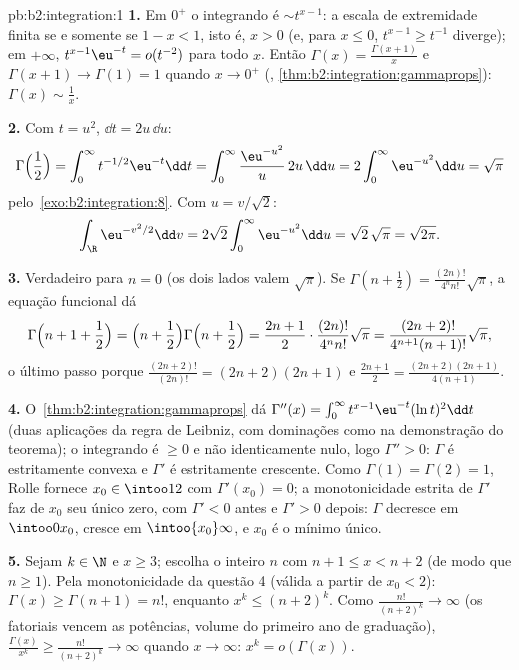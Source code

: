 \begin{solution}{pb:b2:integration:1}
\textbf{1.} Em $0^+$ o integrando é $\sim t^{x-1}$: a
escala de extremidade finita  se e somente se $1 - x < 1$, isto é, $x > 0$
(e, para $x \leq 0$, $t^{x-1} \geq t^{-1}$ diverge); em
$+\infty$, $t^{x-1}\eu^{-t} = o(t^{-2})$  para todo
$x$. Então $\Gamma(x) = \frac{\Gamma(x+1)}{x}$ e $\Gamma(x+1)
\to \Gamma(1) = 1$ quando $x \to 0^+$ (,
\cref{thm:b2:integration:gammaprops}): $\Gamma(x) \sim
\frac1x$.

\textbf{2.} Com $t = u^2$, $\dd t = 2u\,\dd u$:
\[
\Gamma\Bigl(\frac12\Bigr) = \int_0^\infty
t^{-1/2}\eu^{-t}\dd t
= \int_0^\infty \frac{\eu^{-u^2}}{u}\,2u\,\dd u
= 2\int_0^\infty \eu^{-u^2}\dd u = \sqrt\pi
\]
pelo~\cref{exo:b2:integration:8}. Com $u = v/\sqrt2$:
\[
\int_\R \eu^{-v^2/2}\dd v
= 2\sqrt2\int_0^\infty \eu^{-u^2}\dd u
= \sqrt2\,\sqrt\pi = \sqrt{2\pi} .
\]

\textbf{3.} Verdadeiro para $n = 0$ (os dois lados valem $\sqrt\pi$). Se
$\Gamma(n + \frac12) = \frac{(2n)!}{4^n n!}\sqrt\pi$, a
equação funcional dá
\[
\Gamma\Bigl(n + 1 + \frac12\Bigr)
= \Bigl(n + \frac12\Bigr)\Gamma\Bigl(n + \frac12\Bigr)
= \frac{2n+1}{2}\cdot\frac{(2n)!}{4^n n!}\sqrt\pi
= \frac{(2n+2)!}{4^{n+1}(n+1)!}\sqrt\pi ,
\]
o último passo porque $\frac{(2n+2)!}{(2n)!} = (2n+2)(2n+1)$
e $\frac{2n+1}{2} = \frac{(2n+2)(2n+1)}{4(n+1)}$.

\textbf{4.} O~\cref{thm:b2:integration:gammaprops} dá
$\Gamma''(x) = \int_0^\infty t^{x-1}\eu^{-t}(\ln t)^2\dd t$
(duas aplicações da regra de Leibniz, com dominações como na
demonstração do teorema); o integrando é $\geq 0$ e não identicamente
nulo, logo $\Gamma'' > 0$: $\Gamma$ é estritamente convexa e
$\Gamma'$ é estritamente crescente. Como $\Gamma(1) = \Gamma(2)
= 1$, Rolle fornece $x_0 \in \intoo12$ com $\Gamma'(x_0) =
0$; a monotonicidade estrita de $\Gamma'$ faz de $x_0$ seu único
zero, com $\Gamma' < 0$ antes e $\Gamma' > 0$ depois:
$\Gamma$ decresce em $\intoo0{x_0}$, cresce em
$\intoo{x_0}\infty$, e $x_0$ é o mínimo único.

\textbf{5.} Sejam $k \in \N$ e $x \geq 3$; escolha o inteiro
$n$ com $n + 1 \leq x < n + 2$ (de modo que $n \geq 1$). Pela
monotonicidade da questão 4 (válida a partir de $x_0 < 2$): $\Gamma(x)
\geq \Gamma(n + 1) = n!$, enquanto $x^k \leq (n+2)^k$. Como
$\frac{n!}{(n+2)^k} \to \infty$ (os fatoriais vencem as potências, volume do primeiro ano
de graduação), $\frac{\Gamma(x)}{x^k} \geq \frac{n!}{(n+2)^k} \to
\infty$ quando $x \to \infty$: $x^k = o(\Gamma(x))$.


\end{solution}
